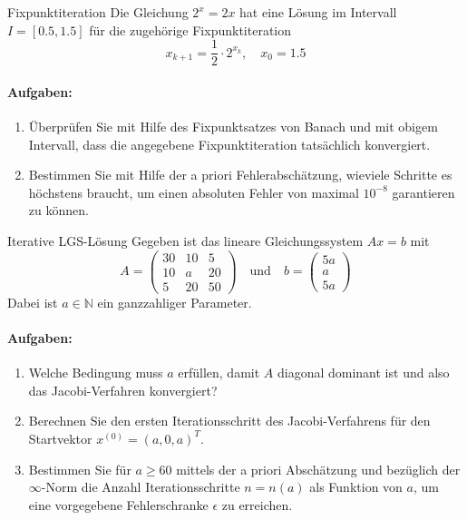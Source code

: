 \begin{example2}{Fixpunktiteration}
Die Gleichung $2^x = 2x$ hat eine Lösung im Intervall $I = [0.5, 1.5]$ für die zugehörige Fixpunktiteration
$$x_{k+1} = \frac{1}{2} \cdot 2^{x_k}, \quad x_0 = 1.5$$

\paragraph{Aufgaben:}
\begin{enumerate}
    \item Überprüfen Sie mit Hilfe des Fixpunktsatzes von Banach und mit obigem Intervall, dass die angegebene Fixpunktiteration tatsächlich konvergiert.
    
    \item Bestimmen Sie mit Hilfe der a priori Fehlerabschätzung, wieviele Schritte es höchstens braucht, um einen absoluten Fehler von maximal $10^{-8}$ garantieren zu können.
\end{enumerate}
\end{example2}

\begin{example2}{Iterative LGS-Lösung}
Gegeben ist das lineare Gleichungssystem $Ax = b$ mit
$$A = \begin{pmatrix}
30 & 10 & 5\\
10 & a & 20\\
5 & 20 & 50
\end{pmatrix}
\quad \text{und} \quad
b = \begin{pmatrix}
5a\\
a\\
5a
\end{pmatrix}$$
Dabei ist $a \in \mathbb{N}$ ein ganzzahliger Parameter.

\paragraph{Aufgaben:}
\begin{enumerate}
    \item Welche Bedingung muss $a$ erfüllen, damit $A$ diagonal dominant ist und also das Jacobi-Verfahren konvergiert?
    
    \item Berechnen Sie den ersten Iterationsschritt des Jacobi-Verfahrens für den Startvektor $x^{(0)} = (a,0,a)^T$.
    
    \item Bestimmen Sie für $a \geq 60$ mittels der a priori Abschätzung und bezüglich der $\infty$-Norm die Anzahl Iterationsschritte $n = n(a)$ als Funktion von $a$, um eine vorgegebene Fehlerschranke $\epsilon$ zu erreichen.
\end{enumerate}
\end{example2}

